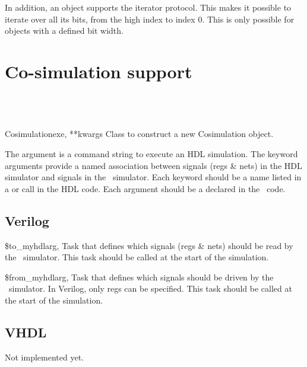 In addition, an  object supports the iterator protocol. This
makes it possible to iterate over all its bits, from the high index to
index 0. This is only possible for  objects with a
defined bit width.


\section{Co-simulation support \label{ref-cosim}}

\subsection{\myhdl\ \label{ref-cosim-myhdl}}

\begin{classdesc}{Cosimulation}{exe, **kwargs}
Class to construct a new Cosimulation object. 

The  argument is a command string to
execute an HDL simulation. The  keyword
arguments provide a named association between signals
(regs \& nets) in the HDL simulator and signals in the
\myhdl\ simulator. Each keyword should be a name listed
in a  or  call in
the HDL code. Each argument should be a 
declared in the \myhdl\ code.

\end{classdesc}

\subsection{Verilog \label{ref-cosim-verilog}}

\begin{funcdesc}{\$to_myhdl}{arg, }
Task that defines which signals (regs \& nets) should be
read by the \myhdl\ simulator.
This task should be called at the start of the simulation.
\end{funcdesc}

\begin{funcdesc}{\$from_myhdl}{arg, }
Task that defines which signals should be
driven by the \myhdl\ simulator. In Verilog, only regs
can be specified.
This task should be called at the start of the simulation.
\end{funcdesc}


\subsection{VHDL \label{ref-cosim-vhdl}}

Not implemented yet.
